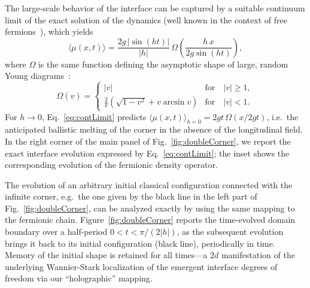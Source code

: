 \documentclass[reprint,aps,prl,superscriptaddress,english,nolongbibliography]{revtex4-2}
\begin{document}
The large-scale behavior of the interface can be captured by a suitable continuum limit of the exact solution of the dynamics (well known in the context of free fermions~\cite{Antal1999Transport,SupplMat}), which yields
\begin{equation}
    \label{eq:contLimit}
    \langle\mu(x,t)\rangle =  \frac{2g\,|\sin(ht)|}{|h|} \, \Omega \left(\frac{h\, x}{2g \sin(ht)}\right),
\end{equation}
where $\Omega$ is the same function defining the asymptotic shape of large, random Young diagrams~\cite{Logan1977Variational,Vershik1977AsymPlancherel,Vershik1977AsymMaximal,Okounkov2000Random}:
\begin{equation}
\label{eq:Okounkov}
    \Omega(v)=
    \begin{cases}
        |v| &\mbox{for}\quad  |v| \geq 1, \\
        \frac{2}{\pi} \left(\sqrt{1-v^2} + v \arcsin v \right) &\mbox{for}\quad  |v| < 1.
\end{cases}
\end{equation}
For $h\to 0$, Eq.~\eqref{eq:contLimit} predicts $\langle \mu(x,t) \rangle_{h=0} = 2gt \, \Omega( x/2gt)$, i.e.\ the anticipated ballistic melting of the corner in the absence of the longitudinal field. In the right corner of the main panel of Fig.~\ref{fig:doubleCorner}, we report the exact interface evolution expressed by Eq.~\eqref{eq:contLimit}; the inset shows the corresponding evolution of the fermionic density operator.

The evolution of an arbitrary initial classical configuration connected with the infinite corner, e.g.~the one given by the black line in the left part of Fig.~\ref{fig:doubleCorner}, can be analyzed exactly by using the same mapping to the fermionic chain. Figure~\ref{fig:doubleCorner} reports the time-evolved domain boundary over a half-period $0<t<\pi/(2|h|)$, as the subsequent evolution brings it back to its initial configuration (black line), periodically in time. Memory of the initial shape is retained for all times---a $2d$ manifestation of the underlying Wannier-Stark localization of the emergent interface degrees of freedom via our ``holographic'' mapping. 
\end{document}
